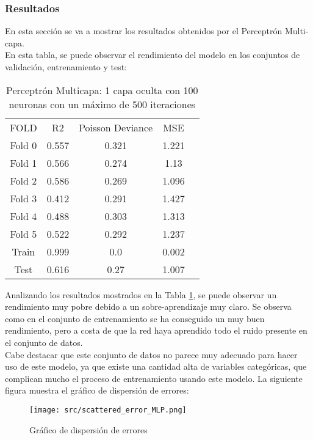 \subsubsection*{Resultados}
En esta sección se va a mostrar los resultados obtenidos por el Perceptrón Multi-capa. \\
\linebreak
En esta tabla, se puede observar el rendimiento del modelo en los conjuntos de validación, entrenamiento y test:
\begin{table}[H]
	\centering
	\begin{tabular}{|c|c|c|c|c}
		\cline{1-4}
		FOLD   & R2    & Poisson Deviance & MSE   \\\cline{1-4}
		Fold 0 & 0.557 & 0.321            & 1.221 \\\cline{1-4}
		Fold 1 & 0.566 & 0.274            & 1.13  \\\cline{1-4}
		Fold 2 & 0.586 & 0.269            & 1.096 \\\cline{1-4}
		Fold 3 & 0.412 & 0.291            & 1.427 \\\cline{1-4}
		Fold 4 & 0.488 & 0.303            & 1.313 \\\cline{1-4}
		Fold 5 & 0.522 & 0.292            & 1.237 \\\cline{1-4}
		Train  & 0.999 & 0.0              & 0.002 \\\cline{1-4}
		Test   & 0.616 & 0.27             & 1.007 \\\cline{1-4}
	\end{tabular}
	\caption{Perceptrón Multicapa: 1 capa oculta con 100 neuronas con un máximo de 500 iteraciones}
	\label{tab:mlp_res}
\end{table}
Analizando los resultados mostrados en la Tabla \ref{tab:mlp_res}, se puede observar un rendimiento muy pobre debido a un sobre-aprendizaje muy claro. Se observa como en el conjunto de entrenamiento se ha conseguido un muy buen rendimiento, pero a costa de que la red haya aprendido todo el ruido presente en el conjunto de datos.\\
\linebreak
Cabe destacar que este conjunto de datos no parece muy adecuado para hacer uso de este modelo, ya que existe una cantidad alta de variables categóricas, que complican mucho el proceso de entrenamiento usando este modelo.
\clearpage
La siguiente figura muestra el gráfico de dispersión de errores:
\begin{figure}[H]
	\centering
	\texttt{[image: src/scattered\_error\_MLP.png]}
	\caption{Gráfico de dispersión de errores}
	\label{fig:mlp_scattered}
\end{figure}
